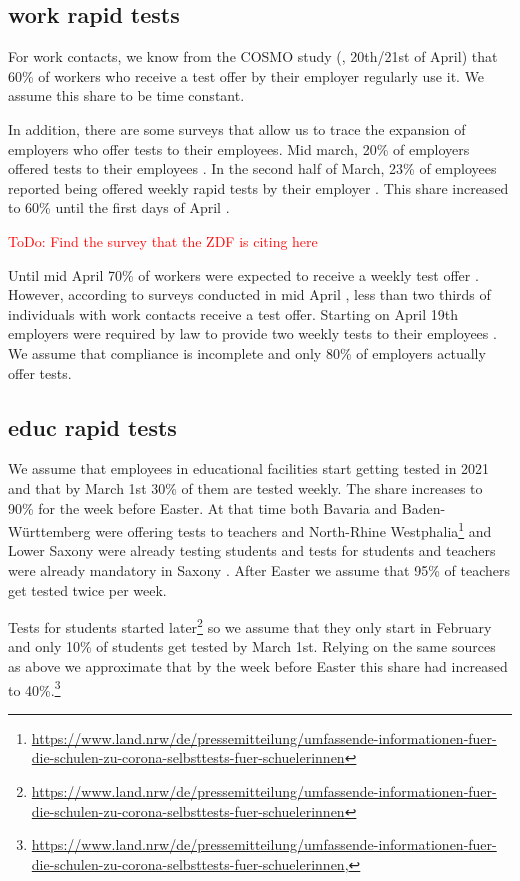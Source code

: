 \subsection{work rapid tests}

For work contacts, we know from the COSMO study (\cite{Betsch2021}, 20th/21st of April)
that 60\% of workers who receive a test offer by their employer regularly use it. We
assume this share to be time constant.

In addition, there are some surveys that allow us to trace the expansion of employers who
offer tests to their employees. Mid march, 20\% of employers offered tests to their
employees \citep{DIHK2021}. In the second half of March, 23\% of employees reported being
offered weekly rapid tests by their employer \citep{Ahlers2021}. This share increased to
60\% until the first days of April \cite{ZDF2021}.

\textcolor{red}{ToDo: Find the survey that the ZDF is citing here}

Until mid April 70\% of workers were expected to receive a
weekly test offer \citep{AerzteZeitung2021}. However, according to surveys conducted in
mid April \citep{Betsch2021}, less than two thirds of individuals with work contacts
receive a test offer. Starting on April 19th employers were required by law to provide
two weekly tests to their employees \citep{Bundesanzeiger2021}. We assume that compliance
is incomplete and only 80\% of employers actually offer tests.

\subsection{educ rapid tests}

We assume that employees in educational facilities start getting tested in 2021 and that
by March 1st 30\% of them are tested weekly. The share increases to 90\% for the week
before Easter. At that time both Bavaria \citep{BayrischerRundfunk2021} and
Baden-Württemberg \citep{MinisteriumKultus2021} were offering tests to teachers and
North-Rhine
Westphalia\footnote{\url{https://www.land.nrw/de/pressemitteilung/umfassende-informationen-fuer-die-schulen-zu-corona-selbsttests-fuer-schuelerinnen}}
\cite{DPA2021} and Lower Saxony \citep{SueddeutscheZeitung2021} were already testing
students and tests for students and teachers were already mandatory in Saxony
\citep{SueddeutscheZeitung2021a}. After Easter we assume that 95\% of teachers get tested
twice per week.

Tests for students started
later\footnote{\url{https://www.land.nrw/de/pressemitteilung/umfassende-informationen-fuer-die-schulen-zu-corona-selbsttests-fuer-schuelerinnen}}
\citep{MinisteriumKultus2021} so we assume that they only start in February and only 10\%
of students get tested by March 1st. Relying on the same sources as above we approximate
that by the week before Easter this share had increased to 40\%.\footnote{\url{https://www.land.nrw/de/pressemitteilung/umfassende-informationen-fuer-die-schulen-zu-corona-selbsttests-fuer-schuelerinnen}, }


